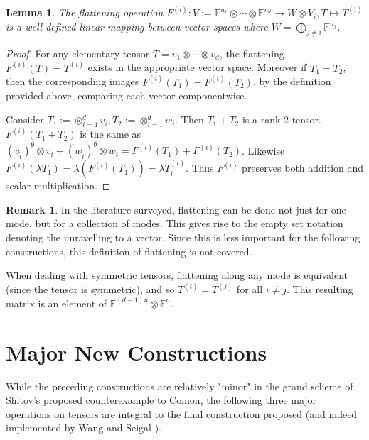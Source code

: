 \documentclass[12pt,a4paper,oneside]{book}
\def\field{\mathbb{F}} %
\newtheorem{lemma}[theorem]{Lemma}
\theoremstyle{definition}
\newtheorem*{remark}{Remark}
\begin{document}
\begin{lemma}
    The flattening operation $F^{(i)}: V:= \field^{n_1} \otimes \cdots \otimes \field^{n_d} \to W \otimes V_i, T \mapsto T^{(i)}$ is a well defined linear mapping between vector spaces where $W = \bigoplus_{j \neq i} \field^{n_j}$. 
\end{lemma}
\begin{proof}
    For any elementary tensor $T = v_1 \otimes \cdots \otimes v_d$, the flattening $F^{(i)}(T) = T^{(i)}$ exists in the appropriate vector space. Moreover if $T_1 = T_2$, then the corresponding images $F^{(i)}(T_1) = F^{(i)}(T_2)$, by the definition provided above, comparing each vector componentwise.

    Consider $T_1 := \otimes_{i=1}^d v_i, T_2:= \otimes_{i=1}^d w_i$. Then $T_1 + T_2$ is a rank 2-tensor. $F^{(i)}(T_1 + T_2)$ is the same as $(v_{\hat{i}})^{\emptyset} \otimes v_i + (w_{\hat{i}})^{\emptyset} \otimes w_i = F^{(i)}(T_1) + F^{(i)}(T_2)$. Likewise $F^{(i)}(\lambda T_1) = \lambda(F^{(i)}(T_1)) = \lambda T_i^{(i)}$. Thus $F^{(i)}$ preserves both addition and scalar multiplication.
\end{proof}
\begin{remark}
    In the literature surveyed, flattening can be done not just for one mode, but for a collection of modes. This gives rise to the empty set notation denoting the unravelling to a vector. Since this is less important for the following constructions, this definition of flattening is not covered.
\end{remark}

When dealing with symmetric tensors, flattening along any mode is equivalent (since the tensor is symmetric), and so $T^{(i)} = T^{(j)}$ for all $i \neq j$. This resulting matrix is an element of $\field^{(d-1)n} \otimes \field^n$.
\section{Major New Constructions}\label{section:majorconstructions}
While the preceding constructions are relatively "minor" in the grand scheme of Shitov's proposed counterexample to Comon, the following three major operations on tensors are integral to the final construction proposed (and indeed implemented by Wang and Seigal \cite{wang_lower_2023}). 
\end{document}
